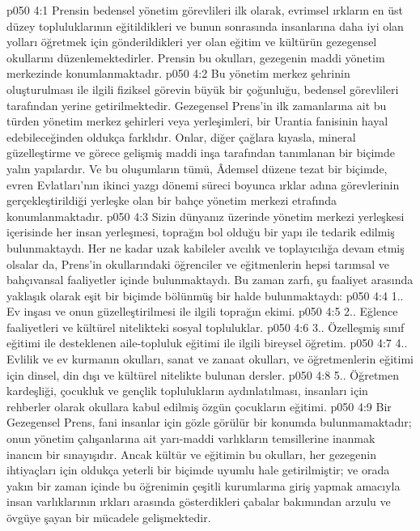 \vs p050 4:1 Prensin bedensel yönetim görevlileri ilk olarak, evrimsel ırkların en üst düzey topluluklarının eğitildikleri ve bunun sonrasında insanlarına daha iyi olan yolları öğretmek için gönderildikleri yer olan eğitim ve kültürün gezegensel okullarını düzenlemektedirler. Prensin bu okulları, gezegenin maddi yönetim merkezinde konumlanmaktadır.
\vs p050 4:2 Bu yönetim merkez şehrinin oluşturulması ile ilgili fiziksel görevin büyük bir çoğunluğu, bedensel görevlileri tarafından yerine getirilmektedir. Gezegensel Prens’in ilk zamanlarına ait bu türden yönetim merkez şehirleri veya yerleşimleri, bir Urantia fanisinin hayal edebileceğinden oldukça farklıdır. Onlar, diğer çağlara kıyasla, mineral güzelleştirme ve görece gelişmiş maddi inşa tarafından tanımlanan bir biçimde yalın yapılardır. Ve bu oluşumların tümü, Âdemsel düzene tezat bir biçimde, evren Evlatları’nın ikinci yazgı dönemi süreci boyunca ırklar adına görevlerinin gerçekleştirildiği yerleşke olan bir bahçe yönetim merkezi etrafında konumlanmaktadır.
\vs p050 4:3 Sizin dünyanız üzerinde yönetim merkezi yerleşkesi içerisinde her insan yerleşmesi, toprağın bol olduğu bir yapı ile tedarik edilmiş bulunmaktaydı. Her ne kadar uzak kabileler avcılık ve toplayıcılığa devam etmiş olsalar da, Prens’in okullarındaki öğrenciler ve eğitmenlerin hepsi tarımsal ve bahçıvansal faaliyetler içinde bulunmaktaydı. Bu zaman zarfı, şu faaliyet arasında yaklaşık olarak eşit bir biçimde bölünmüş bir halde bulunmaktaydı:
\vs p050 4:4 1.\bibnobreakspace {}. Ev inşası ve onun güzelleştirilmesi ile ilgili toprağın ekimi.
\vs p050 4:5 2.\bibnobreakspace {}. Eğlence faaliyetleri ve kültürel nitelikteki sosyal topluluklar.
\vs p050 4:6 3.\bibnobreakspace {}. Özelleşmiş sınıf eğitimi ile desteklenen aile\hyp{}topluluk eğitimi ile ilgili bireysel öğretim.
\vs p050 4:7 4.\bibnobreakspace {}. Evlilik ve ev kurmanın okulları, sanat ve zanaat okulları, ve öğretmenlerin eğitimi için dinsel, din dışı ve kültürel nitelikte bulunan dersler.
\vs p050 4:8 5.\bibnobreakspace {}. Öğretmen kardeşliği, çocukluk ve gençlik toplulukların aydınlatılması, insanları için rehberler olarak okullara kabul edilmiş özgün çocukların eğitimi.
\vs p050 4:9 Bir Gezegensel Prens, fani insanlar için gözle görülür bir konumda bulunmamaktadır; onun yönetim çalışanlarına ait yarı\hyp{}maddi varlıkların temsillerine inanmak inancın bir sınayışıdır. Ancak kültür ve eğitimin bu okulları, her gezegenin ihtiyaçları için oldukça yeterli bir biçimde uyumlu hale getirilmiştir; ve orada yakın bir zaman içinde bu öğrenimin çeşitli kurumlarına giriş yapmak amacıyla insan varlıklarının ırkları arasında gösterdikleri çabalar bakımından arzulu ve övgüye şayan bir mücadele gelişmektedir.
